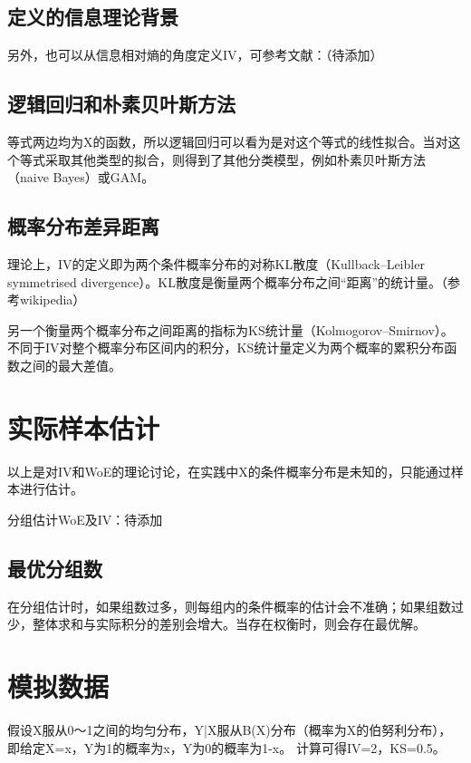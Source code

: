 \documentclass[a4paper,UTF8]{ctexart}
\begin{document}
\subsection{定义的信息理论背景}

另外，也可以从信息相对熵的角度定义IV，可参考文献：（待添加）

\subsection{逻辑回归和朴素贝叶斯方法}

等式两边均为X的函数，所以逻辑回归可以看为是对这个等式的线性拟合。当对这个等式采取其他类型的拟合，则得到了其他分类模型，例如朴素贝叶斯方法（naive Bayes）或GAM。 
\subsection{概率分布差异距离}
理论上，IV的定义即为两个条件概率分布的对称KL散度（Kullback–Leibler symmetrised divergence）。KL散度是衡量两个概率分布之间“距离”的统计量。（参考wikipedia）

另一个衡量两个概率分布之间距离的指标为KS统计量（Kolmogorov–Smirnov）。不同于IV对整个概率分布区间内的积分，KS统计量定义为两个概率的累积分布函数之间的最大差值。


\section{实际样本估计}

以上是对IV和WoE的理论讨论，在实践中X的条件概率分布是未知的，只能通过样本进行估计。

分组估计WoE及IV：待添加

\subsection{最优分组数}

在分组估计时，如果组数过多，则每组内的条件概率的估计会不准确；如果组数过少，整体求和与实际积分的差别会增大。当存在权衡时，则会存在最优解。



\section{模拟数据}

假设X服从0～1之间的均匀分布，Y|X服从B(X)分布（概率为X的伯努利分布），即给定X=x，Y为1的概率为x，Y为0的概率为1-x。 计算可得IV=2，KS=0.5。 
\end{document}

